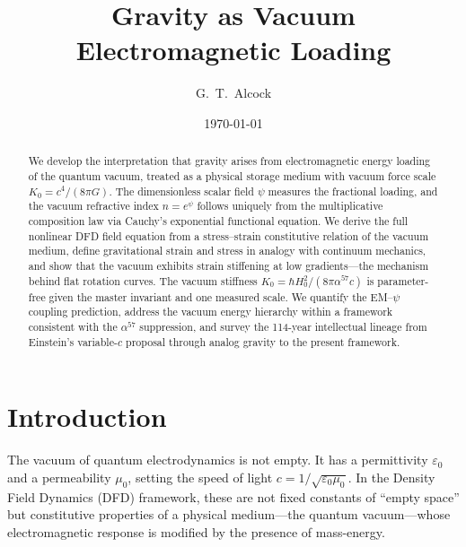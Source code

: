 \documentclass[aps,prd,twocolumn,superscriptaddress,nofootinbib]{revtex4-2}
\begin{document}
\title{Gravity as Vacuum Electromagnetic Loading}

\author{G.~T.~Alcock}

\date{\today}

\begin{abstract}
We develop the interpretation that gravity arises from electromagnetic
energy loading of the quantum vacuum, treated as a physical storage
medium with vacuum force scale $K_0 = c^4/(8\pi G)$.  The dimensionless
scalar field $\psi$ measures the fractional loading, and the vacuum
refractive index $n = e^\psi$ follows uniquely from the multiplicative
composition law via Cauchy's exponential functional equation.  We derive
the full nonlinear DFD field equation from a stress--strain constitutive
relation of the vacuum medium, define gravitational strain and stress
in analogy with continuum mechanics, and show that the vacuum exhibits
strain stiffening at low gradients---the mechanism behind flat rotation
curves.  The vacuum stiffness $K_0 = \hbar H_0^2/(8\pi\alpha^{57}c)$
is parameter-free given the master invariant and one measured scale.
We quantify the EM--$\psi$ coupling prediction, address the vacuum
energy hierarchy within a framework consistent with the $\alpha^{57}$
suppression, and survey the 114-year intellectual lineage from Einstein's
variable-$c$ proposal through analog gravity to the present framework.
\end{abstract}

\maketitle


\section{Introduction}
\label{sec:intro}

The vacuum of quantum electrodynamics is not empty.  It has a
permittivity $\varepsilon_0$ and a permeability $\mu_0$, setting the
speed of light $c = 1/\sqrt{\varepsilon_0\mu_0}$.  In the Density
Field Dynamics (DFD) framework, these are not fixed constants of
``empty space'' but constitutive properties of a physical medium---the
quantum vacuum---whose electromagnetic response is modified by the
presence of mass-energy.
\end{document}
